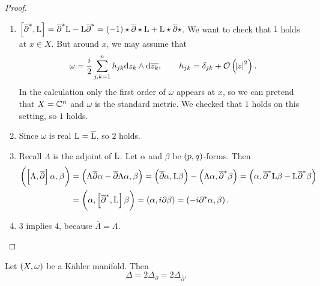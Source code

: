 \begin{proof}
\hfill
\begin{enumerate}
\item $ \sbr{\overline{\partial}^*, \L} = \overline{\partial}^*\L - \L\overline{\partial}^* = \br{-1}\star\overline{\partial}\star\L + \L\star\overline{\partial}\star $. We want to check that $ 1 $ holds at $ x \in X $. But around $ x $, we may assume that
$$ \omega = \dfrac{i}{2}\sum_{j, k = 1}^n h_{jk}\d z_k \wedge \d\overline{z_k}, \qquad h_{jk} = \delta_{jk} + \OOO\br{\abs{z}^2}. $$
In the calculation only the first order of $ \omega $ appears at $ x $, so we can pretend that $ X = \mathbb{C}^n $ and $ \omega $ is the standard metric. We checked that $ 1 $ holds on this setting, so $ 1 $ holds.
\item Since $ \omega $ is real $ \mathrm{L} = \overline{\mathrm{L}} $, so $ 2 $ holds.
\item Recall $ \Lambda $ is the adjoint of $ \mathrm{L} $. Let $ \alpha $ and $ \beta $ be $ \br{p, q} $-forms. Then
\begin{align*}
\br{\sbr{\Lambda, \overline{\partial}}\alpha, \beta}
& = \br{\Lambda\overline{\partial}\alpha - \overline{\partial}\Lambda\alpha, \beta}
= \br{\overline{\partial}\alpha, \L\beta} - \br{\Lambda\alpha, \overline{\partial}^*\beta}
= \br{\alpha, \overline{\partial}^*\L\beta - \L\overline{\partial}^*\beta} \\
& = \br{\alpha, \sbr{\overline{\partial}^*, \L}\beta}
= \br{\alpha, i\partial\beta}
= \br{-i\partial^*\alpha, \beta}.
\end{align*}
\item $ 3 $ implies $ 4 $, because $ \overline{\Lambda} = \Lambda $.
\end{enumerate}
\end{proof}

\pagebreak

\begin{theorem}
\label{thm:6.33}
Let $ \br{X, \omega} $ be a K\"ahler manifold. Then
$$ \Delta = 2\Delta_\partial = 2\Delta_{\overline{\partial}}. $$
\end{theorem}

